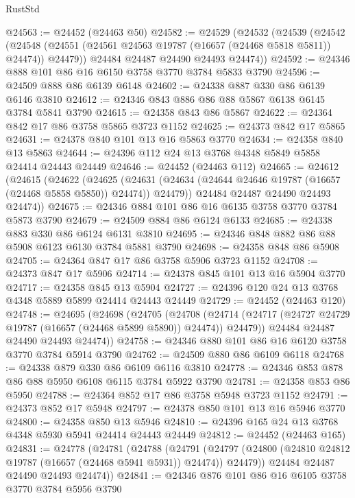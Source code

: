 \begin{lexlean}{RustStd}
\begin{coremodule}
@24563 := @24452 (@24463 @50)
@24582 := @24529
    (@24532
      (@24539
        (@24542
          (@24548 (@24551 (@24561 @24563 @19787 (@16657 (@24468 @5818 @5811)) @24474)) @24479))
        @24484
        @24487
        @24490
        @24493
        @24474))
@24592 := @24346 @888 @101 @86 @16 @6150 @3758 @3770 @3784 @5833 @3790
@24596 := @24509 @888 @86 @6139 @6148
@24602 := @24338 @887 @330 @86 @6139 @6146 @3810
@24612 := @24346 @843 @886 @86 @88 @5867 @6138 @6145 @3784 @5841 @3790
@24615 := @24358 @843 @86 @5867
@24622 := @24364 @842 @17 @86 @3758 @5865 @3723 @1152
@24625 := @24373 @842 @17 @5865
@24631 := @24378 @840 @101 @13 @16 @5863 @3770
@24634 := @24358 @840 @13 @5863
@24644 := @24396 @112 @24 @13 @3768 @4348 @5849 @5858 @24414 @24443 @24449
@24646 := @24452 (@24463 @112)
@24665 := @24612
    (@24615
      (@24622
        (@24625
          (@24631 (@24634 (@24644 @24646 @19787 (@16657 (@24468 @5858 @5850)) @24474)) @24479))
        @24484
        @24487
        @24490
        @24493
        @24474))
@24675 := @24346 @884 @101 @86 @16 @6135 @3758 @3770 @3784 @5873 @3790
@24679 := @24509 @884 @86 @6124 @6133
@24685 := @24338 @883 @330 @86 @6124 @6131 @3810
@24695 := @24346 @848 @882 @86 @88 @5908 @6123 @6130 @3784 @5881 @3790
@24698 := @24358 @848 @86 @5908
@24705 := @24364 @847 @17 @86 @3758 @5906 @3723 @1152
@24708 := @24373 @847 @17 @5906
@24714 := @24378 @845 @101 @13 @16 @5904 @3770
@24717 := @24358 @845 @13 @5904
@24727 := @24396 @120 @24 @13 @3768 @4348 @5889 @5899 @24414 @24443 @24449
@24729 := @24452 (@24463 @120)
@24748 := @24695
    (@24698
      (@24705
        (@24708
          (@24714 (@24717 (@24727 @24729 @19787 (@16657 (@24468 @5899 @5890)) @24474)) @24479))
        @24484
        @24487
        @24490
        @24493
        @24474))
@24758 := @24346 @880 @101 @86 @16 @6120 @3758 @3770 @3784 @5914 @3790
@24762 := @24509 @880 @86 @6109 @6118
@24768 := @24338 @879 @330 @86 @6109 @6116 @3810
@24778 := @24346 @853 @878 @86 @88 @5950 @6108 @6115 @3784 @5922 @3790
@24781 := @24358 @853 @86 @5950
@24788 := @24364 @852 @17 @86 @3758 @5948 @3723 @1152
@24791 := @24373 @852 @17 @5948
@24797 := @24378 @850 @101 @13 @16 @5946 @3770
@24800 := @24358 @850 @13 @5946
@24810 := @24396 @165 @24 @13 @3768 @4348 @5930 @5941 @24414 @24443 @24449
@24812 := @24452 (@24463 @165)
@24831 := @24778
    (@24781
      (@24788
        (@24791
          (@24797 (@24800 (@24810 @24812 @19787 (@16657 (@24468 @5941 @5931)) @24474)) @24479))
        @24484
        @24487
        @24490
        @24493
        @24474))
@24841 := @24346 @876 @101 @86 @16 @6105 @3758 @3770 @3784 @5956 @3790

\end{coremodule}
\end{lexlean}
